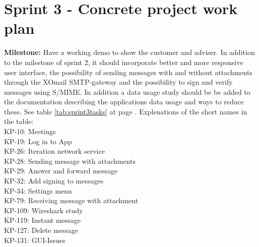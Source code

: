 \section{Sprint 3 - Concrete project work plan}

\textbf{Milestone:} Have a working demo to show the customer and adviser. In addition to the milestone of sprint 2, it should incorporate better and more responsive user interface, the possibility of sending messages with and without attachments through the XOmail SMTP-gateway and the possibility to sign and verify messages using S/MIME. In addition a data usage study should be be added to the documentation describing the applications data usage and ways to reduce these.
\newline
\newline
See table \ref{tab:sprint3tasks} at page \pageref{tab:sprint3tasks}.
\newline
\newline
Explenations of the short names in the table:\\
KP-10: Meetings\\
KP-19: Log in to App\\
KP-26: Iteration network service\\
KP-28: Sending message with attachments\\
KP-29: Answer and forward message\\
KP-32: Add signing to messages\\
KP-34: Settings menu\\
KP-79: Receiving message with attachment\\
KP-109: Wireshark study\\
KP-119: Instant message\\
KP-127: Delete message\\
KP-131: GUI-Issues\\




